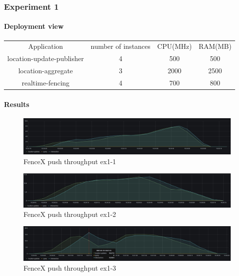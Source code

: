 \documentclass[a4]{report}
\begin{document}
    \subsubsection{Experiment 1}

    \paragraph{Deployment view}
    \begin{center}
        \begin{tabular}{ c c c c }
            Application               & number of instances & CPU(MHz) & RAM(MB) \\
            location-update-publisher & 4                   & 500      & 500     \\
            location-aggregate        & 3                   & 2000     & 2500    \\
            realtime-fencing          & 4                   & 700      & 800     \\
        \end{tabular}
    \end{center}

    \paragraph{Results}
    \begin{figure}[ht]
        \caption{FenceX push throughput ex1-1}
        \label{fig:ex1-1}
        \includegraphics[scale=0.4]{images/evaluation/ex1-benchmarking(15,6).png}
    \end{figure}

    \begin{figure}[ht]
        \caption{FenceX push throughput ex1-2}
        \label{fig:ex1-2}
        \includegraphics[scale=0.4]{images/evaluation/ex1-benchmarking(19,7).png}
    \end{figure}

    \begin{figure}[ht]
        \caption{FenceX push throughput ex1-3}
        \label{fig:ex1-3}
        \includegraphics[scale=0.4]{images/evaluation/ex1-benchmarking(22,9).png}
    \end{figure}
\end{document}
